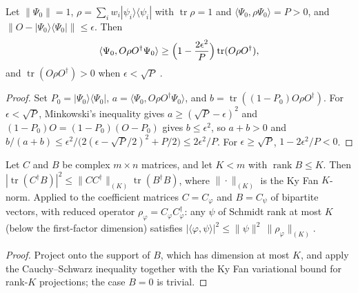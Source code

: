 \begin{lemma}
    \label{thm:hastings_bootstrap_overlap}
    \leanok
    Let $\|\Psi_0\|=1$, $\rho=\sum_iw_i|\psi_i\rangle\langle\psi_i|$ with
    $\operatorname{tr}\rho=1$ and $\langle\Psi_0,\rho\Psi_0\rangle=P>0$, and
    $\|O-|\Psi_0\rangle\langle\Psi_0|\|\le\epsilon$. Then
    \begin{align}
        \langle\Psi_0,O\rho O^\dagger\Psi_0\rangle
        \ge\Bigl(1-\frac{2\epsilon^2}{P}\Bigr)\operatorname{tr}(O\rho O^\dagger),
        \label{eq:hastings_bootstrap_overlap}
    \end{align}
    and $\operatorname{tr}(O\rho O^\dagger)>0$ when $\epsilon<\sqrt P$
    \cite[Lemma~2, eq.~(hg), lines 317--331]{Hastings2007AreaLaw}.
\end{lemma}
\begin{proof}\leanok
    Set $P_0=|\Psi_0\rangle\langle\Psi_0|$,
    $a=\langle\Psi_0,O\rho O^\dagger\Psi_0\rangle$, and
    $b=\operatorname{tr}((1-P_0)O\rho O^\dagger)$. For $\epsilon<\sqrt P$,
    Minkowski's inequality gives $a\ge(\sqrt P-\epsilon)^2$ and
    $(1-P_0)O=(1-P_0)(O-P_0)$ gives $b\le\epsilon^2$, so $a+b>0$ and
    $b/(a+b)\le\epsilon^2/\bigl(2(\epsilon-\sqrt P/2)^2+P/2\bigr)\le2\epsilon^2/P$.
    For $\epsilon\ge\sqrt P$, $1-2\epsilon^2/P<0$.
\end{proof}

\begin{lemma}
    \label{thm:hastings_schmidt_overlap_tail}
    \leanok
    Let $C$ and $B$ be complex $m\times n$ matrices, and let $K<m$ with
    $\operatorname{rank}B\le K$. Then
    $|\operatorname{tr}(C^\dagger B)|^2\le\|CC^\dagger\|_{(K)}\operatorname{tr}(B^\dagger B)$,
    where $\|\cdot\|_{(K)}$ is the Ky Fan $K$-norm. Applied to the coefficient
    matrices $C=C_\varphi$ and $B=C_\psi$ of bipartite vectors, with reduced operator
    $\rho_\varphi=C_\varphi C_\varphi^\dagger$: any $\psi$ of Schmidt rank at most $K$
    (below the first-factor dimension) satisfies
    $|\langle\varphi,\psi\rangle|^2\le\|\psi\|^2\,\|\rho_\varphi\|_{(K)}$.
\end{lemma}
\begin{proof}\leanok
    Project onto the support of $B$, which has dimension at most $K$, and apply the
    Cauchy--Schwarz inequality together with the Ky Fan variational bound for rank-$K$
    projections; the case $B=0$ is trivial.
\end{proof}

